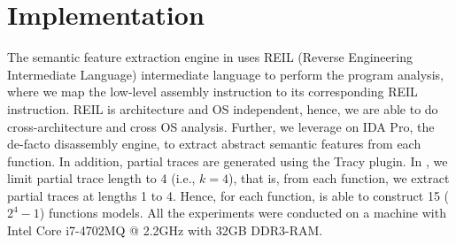\section{Implementation}\label{sec:implementation}
The semantic feature extraction engine in \tool uses REIL (Reverse Engineering Intermediate Language) \cite{dullien2009reil} intermediate language to perform the program analysis, where we map the low-level assembly instruction to its corresponding REIL instruction. REIL is architecture and OS independent, hence, we are able to do cross-architecture and cross OS analysis. Further, we leverage on IDA Pro, the de-facto disassembly engine, to extract abstract semantic features from each function. In addition, partial traces are generated using the Tracy plugin. In \tool, we limit partial trace length to 4 (i.e., $k=4$), that is, from each function, we extract partial traces at lengths 1 to 4. Hence, for each function, \tool is able to construct 15 ($2^4-1$) functions models. All the experiments were conducted on a machine with Intel Core i7-4702MQ @ 2.2GHz with 32GB DDR3-RAM.
